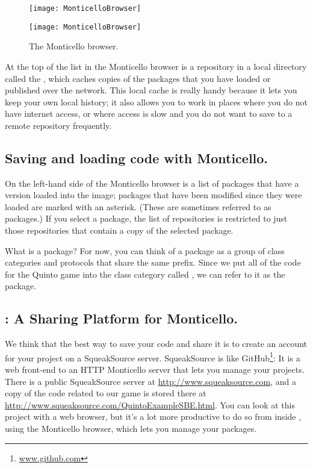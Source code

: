 \documentclass[a4paper,10pt,twoside]{book}
\begin{document}
\begin{figure}[hbt]
\ifluluelse
	{\centerline {\texttt{[image: MonticelloBrowser]}}}
	{\centerline {\texttt{[image: MonticelloBrowser]}}}
\caption{The Monticello browser.
\label{fig:monticello1}}
\end{figure}

At the top of the list in the Monticello browser is a repository in a local directory called the , which caches copies of the packages that you have loaded or published over the network.
This local cache is really handy because it lets you keep your own local history; it also allows you to work in places where you do not have internet access, or where access is slow and you do not want to save to a remote repository frequently.


\subsection{Saving and loading code with Monticello.}
On the left-hand side of the Monticello browser is a list of packages that have a version loaded into the image; packages that have been modified since they were loaded are marked with an asterisk.
(These are sometimes referred to as  packages.)
If you select a package, the list of repositories is restricted to just those repositories that contain a copy of the selected package.

What is a package?
For now, you can think of a package as a group of class categories and protocols that share the same prefix.
Since we put all of the code for the Quinto game into the class category called , we can refer to it as the  package.


\subsection{: A Sharing Platform for Monticello.} 
We think that the best way to save your code and share it is to create an account for your project on a SqueakSource server. 
SqueakSource is like GitHub\footnote{\url{www.github.com}}:
It is a web front-end to an HTTP Monticello server that lets you manage your projects.
There is a public SqueakSource server at \url{http://www.squeaksource.com}, and a copy of the code related to our game is stored there at \url{http://www.squeaksource.com/QuintoExampleSBE.html}.
You can look at this project with a web browser, but it's a lot more productive to do so from inside \squeak, using the Monticello browser, which lets you manage your packages.
\end{document}
